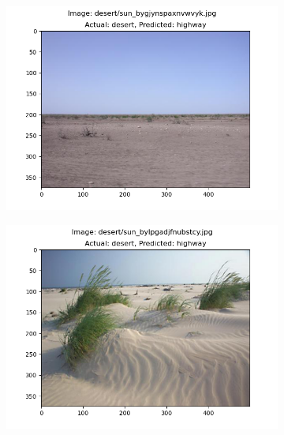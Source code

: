 \documentclass{article} %
\begin{document}
\begin{figure}[h]
\begin{subfigure}[b]{0.333\textwidth}
        \end{subfigure}
        \begin{subfigure}[b]{0.333\textwidth}
            \includegraphics[width=\textwidth]{q2,6_case_49.png}
        \end{subfigure}
        \begin{subfigure}[b]{0.333\textwidth}
            \includegraphics[width=\textwidth]{q2,6_case_51.png}
        \end{subfigure}
        \begin{subfigure}[b]{0.333\textwidth}

\end{subfigure}
\end{figure}
\end{document}
